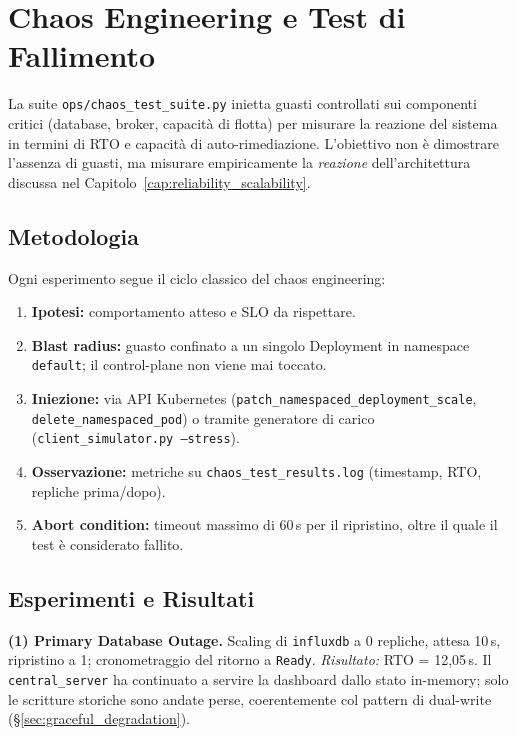 
\chapter{Chaos Engineering e Test di Fallimento}
\label{cap:chaos_engineering}

La suite \texttt{ops/chaos\_test\_suite.py} inietta guasti controllati sui componenti critici (database, broker, capacità di flotta) per misurare la reazione del sistema in termini di RTO e capacità di auto-rimediazione. L'obiettivo non è dimostrare l'assenza di guasti, ma misurare empiricamente la \textit{reazione} dell'architettura discussa nel Capitolo~\ref{cap:reliability_scalability}.

\section{Metodologia}
\label{sec:metodologia_chaos}

Ogni esperimento segue il ciclo classico del chaos engineering:
\begin{enumerate}
    \item \textbf{Ipotesi:} comportamento atteso e SLO da rispettare.
    \item \textbf{Blast radius:} guasto confinato a un singolo Deployment in namespace \texttt{default}; il control-plane non viene mai toccato.
    \item \textbf{Iniezione:} via API Kubernetes (\texttt{patch\_namespaced\_deployment\_scale}, \texttt{delete\_namespaced\_pod}) o tramite generatore di carico (\texttt{client\_simulator.py --stress}).
    \item \textbf{Osservazione:} metriche su \texttt{chaos\_test\_results.log} (timestamp, RTO, repliche prima/dopo).
    \item \textbf{Abort condition:} timeout massimo di 60\,s per il ripristino, oltre il quale il test è considerato fallito.
\end{enumerate}

\section{Esperimenti e Risultati}
\label{sec:esperimenti_chaos}

\textbf{(1) Primary Database Outage.} Scaling di \texttt{influxdb} a 0 repliche, attesa 10\,s, ripristino a 1; cronometraggio del ritorno a \texttt{Ready}. \textit{Risultato:} RTO = 12{,}05\,s. Il \texttt{central\_server} ha continuato a servire la dashboard dallo stato in-memory; solo le scritture storiche sono andate perse, coerentemente col pattern di dual-write (§\ref{sec:graceful_degradation}).

